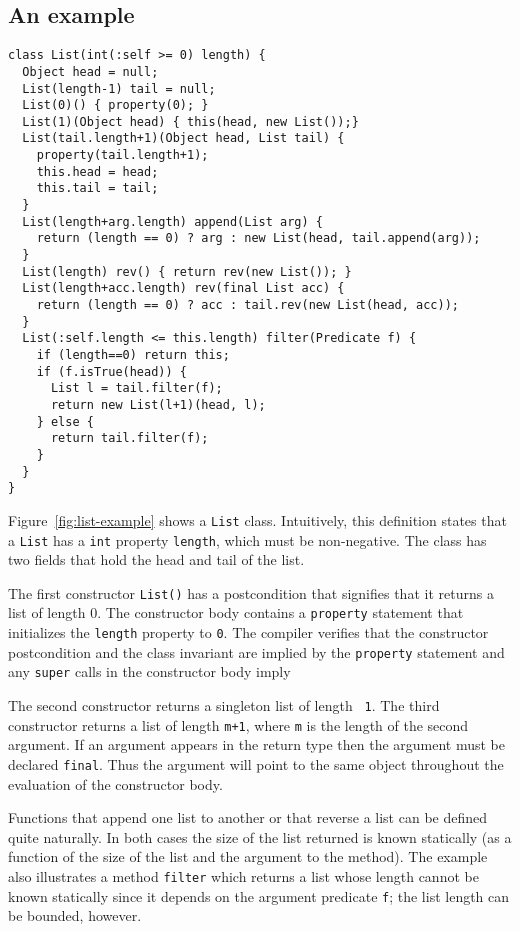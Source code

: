 \subsection{An example}
\begin{figure*}
{\footnotesize
\begin{verbatim}
class List(int(:self >= 0) length) {
  Object head = null;
  List(length-1) tail = null;
  List(0)() { property(0); }
  List(1)(Object head) { this(head, new List());}
  List(tail.length+1)(Object head, List tail) {
    property(tail.length+1);
    this.head = head;
    this.tail = tail;
  }
  List(length+arg.length) append(List arg) {
    return (length == 0) ? arg : new List(head, tail.append(arg));
  }
  List(length) rev() { return rev(new List()); }
  List(length+acc.length) rev(final List acc) {
    return (length == 0) ? acc : tail.rev(new List(head, acc));
  }
  List(:self.length <= this.length) filter(Predicate f) {
    if (length==0) return this;
    if (f.isTrue(head)) {
      List l = tail.filter(f);
      return new List(l+1)(head, l);
    } else {
      return tail.filter(f);
    }
  }
}
\end{verbatim}}
\caption{List example}
\label{fig:list-example}
\end{figure*}

Figure~\ref{fig:list-example} shows a {\tt List} class.
Intuitively, this definition states that a {\tt List} has a {\tt int}
property {\tt length}, which must be non-negative.  The
class has two fields that hold the head and tail of the list.

The first constructor {\tt List()} has a postcondition that
signifies that it returns a list of length 0.
The constructor body contains a {\tt property} statement
that initializes the {\tt length} property to {\tt 0}.
The compiler verifies that
the constructor postcondition and the class invariant
are implied by the {\tt property} statement
and any {\tt super} calls in the constructor body imply

The 
second constructor returns a singleton list of length {\tt
1}. The third constructor returns a list of length {\tt m+1}, where
{\tt m} is the length of the second argument. 
If an argument appears in the return type then the argument must be
declared {\tt final}. Thus the argument will point to the same object
throughout the evaluation of the constructor body.

Functions that append one list to another or that reverse a list can
be defined quite naturally. In both cases the size of the list
returned is known statically (as a function of the size of the list
and the argument to the method).  The example also illustrates a
method {\tt filter} which returns a list whose length cannot be known
statically since it depends on the argument predicate {\tt f};
the list length can be bounded, however.

